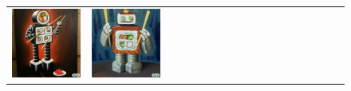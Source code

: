 \begin{figure}[ht!]
\begin{adjustwidth}{-0.8in}{-0.5in}
\begin{tabular}{cccccccccccccccccccc}
\multicolumn{2}{c}{\includegraphics[width=\threebythreecolwidth\textwidth]{figures/cherries/sushi_robot_0.jpg}} &
\multicolumn{2}{c}{\includegraphics[width=\threebythreecolwidth\textwidth]{figures/cherries/sushi_robot_1.jpg}} &

\end{tabular}
\end{adjustwidth}
\end{figure}

